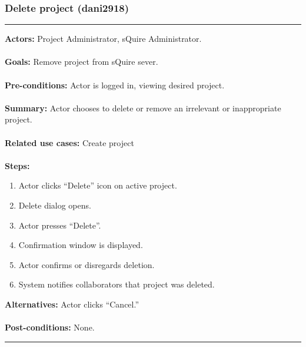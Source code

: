 \documentclass[11pt]{report}
\begin{document}
\subsubsection{Delete project (dani2918)}
\vspace{2pt}
\hrule
\vspace{8pt}
 \textbf{Actors:} Project Administrator, sQuire Administrator. \\ \\
\textbf{Goals:} Remove project from sQuire sever. \\ \\
 \textbf{Pre-conditions:} Actor is logged in, viewing desired project.  \\ \\
\textbf{Summary:} Actor chooses to delete or remove an irrelevant or inappropriate project.  \\ \\
\textbf{Related use cases:} Create project\\ \\
\textbf{Steps:} \begin{enumerate}
  \item Actor clicks ``Delete'' icon on active project.
  \item Delete dialog opens.
  \item Actor presses ``Delete''. 
  \item Confirmation window is displayed.
  \item Actor confirms or disregards deletion.
  \item System notifies collaborators that project was deleted.
 \end{enumerate}
 \textbf{Alternatives:} Actor clicks ``Cancel.'' \\ \\
 \textbf{Post-conditions:} None. \\
\vspace{8pt}
\hrule
\newpage
\end{document}
